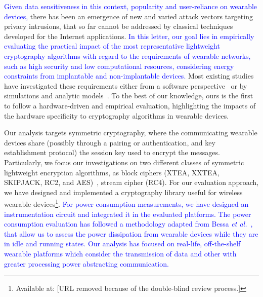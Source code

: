 \documentclass[journal]{IEEEtran}
\newcommand{\rever}{\textcolor{blue}}
\begin{document}
\rever{Given data sensitiveness in this context, popularity and user-reliance on wearable devices,} there has been an emergence of new and varied attack vectors targeting privacy intrusions, that so far cannot be addressed by classical techniques developed for the Internet applications. \rever{In this letter, our goal lies in empirically evaluating the practical impact of the most representative lightweight cryptography algorithms with regard to the requirements of wearable networks, such as high security and low computational resources, considering energy constraints from implantable and non-implantable devices.} Most existing studies have investigated these requirements either from a software perspective~\cite{%
kerckhof2012towards,sallam2018survey} or by simulations and analytic models~\cite{cazorla2013survey,el2017equalized}. To the best of our knowledge, ours is the first to follow a hardware-driven and empirical evaluation, highlighting the impacts of the hardware specificity to cryptography algorithms in wearable devices.

Our analysis targets symmetric cryptography, where the communicating wearable devices share (possibly through a pairing or authentication, and key establishment protocol) the session key used to encrypt the messages. Particularly, we focus our investigations on two different classes of symmetric lightweight encryption algorithms, as block ciphers (XTEA, XXTEA, SKIPJACK, RC2, and AES)~\cite{Moh:2015}, stream cipher (RC4). For our evaluation approach, we have designed and implemented a cryptography library useful for wireless wearable devices\footnote{Available at: [URL removed because of the double-blind review process.]%
}. \rever{For power consumption measurements, we have designed an instrumentation circuit and integrated it in the evaluated platforms. The power consumption evaluation has followed a methodology adapted from Bessa \emph{et al.}~\cite{bessa2017jetsonleap}, that allow us to assess the power dissipation from wearable devices while they are in idle and running states. Our analysis has focused on real-life, off-the-shelf wearable platforms which consider the transmission of data and other with greater processing power abstracting communication.}
\end{document}
